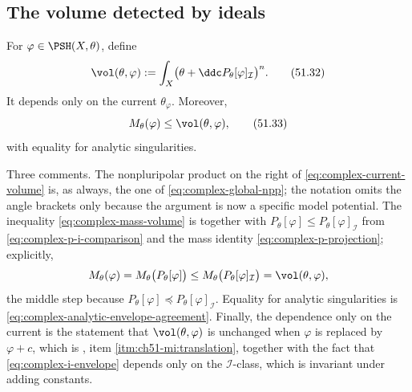 \subsection{The volume detected by ideals}
\label{sec:ch51-current-volume}

\begin{definition}
\label{def:complex-current-volume}
For \(\varphi\in\PSH(X,\theta)\), define
\[
 \vol(\theta,\varphi)
 :=\int_X\bigl(\theta+\ddc
             P_\theta[\varphi]_{\mathcal I}\bigr)^n.
\tag{51.32}\label{eq:complex-current-volume}
\]
It depends only on the current \(\theta_\varphi\).  Moreover,
\[
 M_\theta(\varphi)\leq\vol(\theta,\varphi),
\tag{51.33}\label{eq:complex-mass-volume}
\]
with equality for analytic singularities.
\end{definition}

Three comments.  The nonpluripolar product on the right of
\eqref{eq:complex-current-volume} is, as always, the one of
\eqref{eq:complex-global-npp}; the notation omits the angle brackets only
because the argument is now a specific model potential.  The inequality
\eqref{eq:complex-mass-volume} is
 together with
\(P_\theta[\varphi]\leq P_\theta[\varphi]_{\mathcal I}\) from
\eqref{eq:complex-p-i-comparison} and the mass identity
\eqref{eq:complex-p-projection}; explicitly,
\[
 M_\theta(\varphi)
 =M_\theta\bigl(P_\theta[\varphi]\bigr)
 \leq M_\theta\bigl(P_\theta[\varphi]_{\mathcal I}\bigr)
 =\vol(\theta,\varphi),
\]
the middle step because \(P_\theta[\varphi]\preceq
P_\theta[\varphi]_{\mathcal I}\).  Equality for analytic singularities is
\eqref{eq:complex-analytic-envelope-agreement}.  Finally, the dependence
only on the current is the statement that
\(\vol(\theta,\varphi)\) is unchanged when \(\varphi\) is replaced by
\(\varphi+c\), which is
, item
\cref{itm:ch51-mi:translation}, together with the fact that
\eqref{eq:complex-i-envelope} depends only on the
\(\mathcal I\)-class, which is invariant under adding constants.

